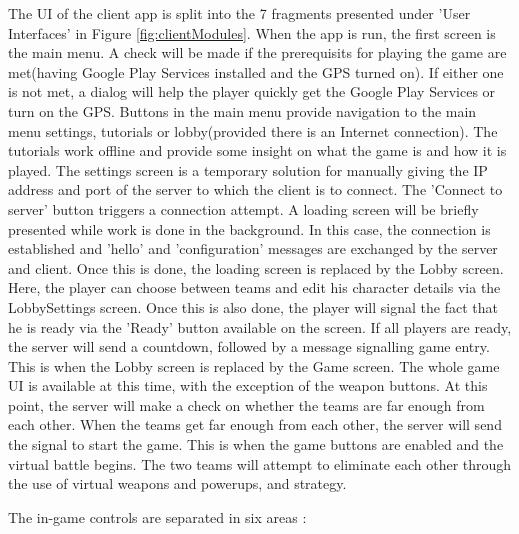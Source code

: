 The UI of the client app is split into the 7 fragments presented under 'User
Interfaces' in Figure \ref{fig:clientModules}. When the app is run, the first
screen is the main menu. A check will be made if the prerequisits for
playing the game are met(having Google Play Services installed and the
GPS turned on). If either one is not met, a dialog will help the player
quickly get the Google Play Services or turn on the GPS. Buttons in the main
menu provide navigation to the main menu settings, tutorials or lobby(provided
there is an Internet connection). The tutorials work offline and provide some
insight on what the game is and how it is played. The settings screen is a
temporary solution for manually giving the IP address and port of the server to
which the client is to connect. The 'Connect to server' button triggers a
connection attempt. A loading screen will be briefly presented while work is
done in the background. In this case, the connection is established and 'hello'
and 'configuration' messages are exchanged by the server and client. Once this
is done, the loading screen is replaced by the Lobby screen. Here, the player
can choose between teams and edit his character details via the LobbySettings
screen. Once this is also done, the player will signal the fact that he is ready
via the 'Ready' button available on the screen. If all players are ready, the
server will send a countdown, followed by a message signalling game entry. This
is when the Lobby screen is replaced by the Game screen. The whole game UI is
available at this time, with the exception of the weapon buttons. At this point,
the server will make a check on whether the teams are far enough from each
other. When the teams get far enough from each other, the server will send the
signal to start the game. This is when the game buttons are enabled and the
virtual battle begins. The two teams will attempt to eliminate each other
through the use of virtual weapons and powerups, and strategy.\newline

The in-game controls are separated in six areas :

